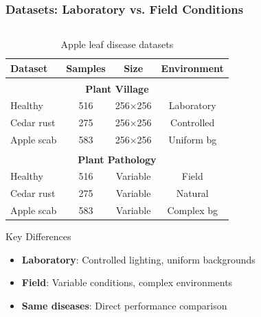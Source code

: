 \documentclass[aspectratio=43]{beamer}
\renewcommand{\thefootnote}{\arabic{footnote}}
\newcommand{\citeHughesOpen}{Hughes \& Salathé. An open access repository of images on plant health. \textit{arXiv:1511.08060}, 2015}
\newcommand{\citeThapaPlant}{Thapa et al. The Plant Pathology 2020 challenge dataset. \textit{arXiv:2004.11958}, 2020}
\newcommand{\fcite}[1]{%
  \stepcounter{footnote}%
  \textsuperscript{\thefootnote}%
  \footnotetext[\value{footnote}]{#1}%
}
\begin{document}
\begin{frame}
    \frametitle{Datasets: Laboratory vs. Field Conditions}
    
    \begin{columns}
        \begin{column}{0.5\textwidth}
            \begin{table}[h]
                \centering
                \caption{Apple leaf disease datasets}
                \scriptsize
                \begin{tabular}{lccc}
                \toprule
                \textbf{Dataset} & \textbf{Samples} & \textbf{Size} & \textbf{Environment} \\
                \midrule
                \multicolumn{4}{c}{\textbf{Plant Village}\fcite{\citeHughesOpen}} \\
                Healthy & 516 & 256×256 & Laboratory \\
                Cedar rust & 275 & 256×256 & Controlled \\
                Apple scab & 583 & 256×256 & Uniform bg \\
                \midrule
                \multicolumn{4}{c}{\textbf{Plant Pathology}\fcite{\citeThapaPlant}} \\
                Healthy & 516 & Variable & Field \\
                Cedar rust & 275 & Variable & Natural \\
                Apple scab & 583 & Variable & Complex bg \\
                \bottomrule
                \end{tabular}
            \end{table}
            
            \begin{alertblock}{Key Differences}
                \begin{itemize}
                    \item \textbf{Laboratory}: Controlled lighting, uniform backgrounds
                    \item \textbf{Field}: Variable conditions, complex environments
                    \item \textbf{Same diseases}: Direct performance comparison
                \end{itemize}
            \end{alertblock}
        \end{column}
        

\end{columns}
\end{frame}
\end{document}

